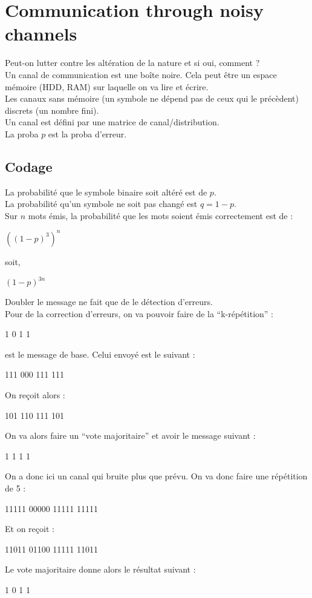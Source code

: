 \section{Communication through noisy channels}
Peut-on lutter contre les altération de la nature et si oui, comment ?\\
Un canal de communication est une boîte noire. Cela peut être un espace mémoire (HDD, RAM) sur laquelle on va lire et écrire.\\
Les canaux sans mémoire (un symbole ne dépend pas de ceux qui le précèdent) discrets (un nombre fini).\\
Un canal est défini par une matrice de canal/distribution.\\
La proba $p$ est la proba d'erreur.\\ 
\subsection{Codage}
La probabilité que le symbole binaire soit altéré est de $p$.\\
La probabilité qu'un symbole ne soit pas changé est $q=1-p$.\\
Sur $n$ mots émis, la probabilité que les mots soient émis correctement est de :\\
\begin{center}
  $((1-p)^3)^n$\\ 
\end{center}
soit,\\
\begin{center}
  $(1-p)^{3n}$\\
\end{center}
Doubler le message ne fait que de le détection d'erreurs.\\
Pour de la correction d'erreurs, on va pouvoir faire de la \enquote{k-répétition} :
\begin{center}
  1 0 1 1 
\end{center}
est le message de base. Celui envoyé est le suivant :
\begin{center}
  111 000 111 111
\end{center}
On reçoit alors :
\begin{center}
  101 110 111 101
\end{center}
On va alors faire un \enquote{vote majoritaire} et avoir le message suivant :
\begin{center}
  1 1 1 1
\end{center}
On a donc ici un canal qui bruite plus que prévu. On va donc faire une répétition de 5 :
\begin{center}
  11111 00000 11111 11111
\end{center}
Et on reçoit :
\begin{center}
  11011 01100 11111 11011
\end{center}
Le vote majoritaire donne alors le résultat suivant :
\begin{center}
  1 0 1 1 
\end{center}
